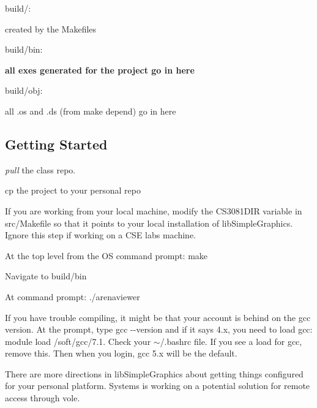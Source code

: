 build/\+:
\begin{DoxyItemize}
\item created by the Makefiles
\end{DoxyItemize}

build/bin\+:
\begin{DoxyItemize}
\item {\bfseries all exes generated for the project go in here}
\end{DoxyItemize}

build/obj\+:
\begin{DoxyItemize}
\item all .o\textquotesingle{}s and .d\textquotesingle{}s (from make depend) go in here
\end{DoxyItemize}





\subsection*{Getting Started}


\begin{DoxyEnumerate}
\item {\itshape pull} the class repo.
\item cp the project to your personal repo
\item If you are working from your local machine, modify the {\ttfamily C\+S3081\+D\+IR} variable in {\ttfamily src/\+Makefile} so that it points to your local installation of lib\+Simple\+Graphics. Ignore this step if working on a C\+SE labs machine.
\item At the top level from the OS command prompt\+: {\ttfamily make}
\item Navigate to {\ttfamily build/bin}
\item At command prompt\+: {\ttfamily ./arenaviewer}
\end{DoxyEnumerate}

If you have trouble compiling, it might be that your account is behind on the gcc version. At the prompt, type {\ttfamily gcc -\/-\/version} and if it says 4.\+x, you need to load gcc\+: {\ttfamily module load /soft/gcc/7.1}. Check your $\sim$/.bashrc file. If you see a load for gcc, remove this. Then when you login, gcc 5.\+x will be the default.

There are more directions in lib\+Simple\+Graphics about getting things configured for your personal platform. Systems is working on a potential solution for remote access through vole.





